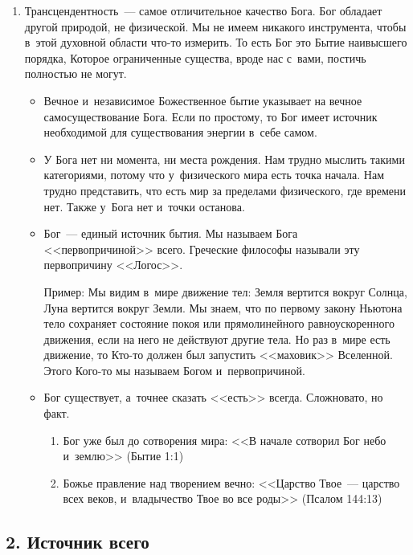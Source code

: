 \documentclass[a4paper,12pt]{article}
\begin{document}
\begin{enumerate}
    \item Трансцендентность~--- самое отличительное качество Бога. Бог обладает другой природой, не физической. Мы не имеем никакого инструмента, чтобы в~этой духовной области что-то измерить. То есть Бог это Бытие наивысшего порядка, Которое ограниченные существа, вроде нас с~вами, постичь полностью не могут. 
    
    \begin{itemize}
        \item Вечное и~независимое Божественное бытие указывает на вечное самосуществование Бога. Если по простому, то Бог имеет источник необходимой для существования энергии в~себе самом.
        \item У Бога нет ни момента, ни места рождения. Нам трудно мыслить такими категориями, потому что у~физического мира есть точка начала. Нам трудно представить, что есть мир за пределами физического, где времени нет. Также у~Бога нет и~точки останова.
        \item Бог~--- единый источник бытия. Мы называем Бога <<первопричиной>> всего. Греческие философы называли эту первопричину <<Логос>>. 
        
        Пример: Мы видим в~мире движение тел: Земля вертится вокруг Солнца, Луна вертится вокруг Земли. Мы знаем, что по первому закону Ньютона тело сохраняет состояние покоя или прямолинейного равноускоренного движения, если на него не действуют другие тела. Но раз в~мире есть движение, то Кто-то должен был запустить <<маховик>> Вселенной. Этого Кого-то мы называем Богом и~первопричиной.

        \item Бог существует, а~точнее сказать <<есть>> всегда. Сложновато, но факт.
        \begin{enumerate}
            \item Бог уже был до сотворения мира: <<В начале сотворил Бог небо и~землю>> (Бытие 1:1)
            \item Божье правление над творением вечно: <<Царство Твое~--- царство всех веков, и~владычество Твое во все роды>> (Псалом 144:13)
        \end{enumerate}
    \end{itemize}
\end{enumerate}
        
\subsection{2. Источник всего}        
            
\end{document}
